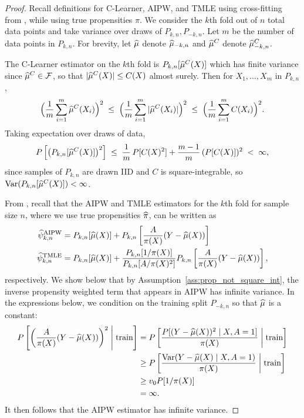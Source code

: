 \begin{proof}
Recall definitions for C-Learner, AIPW, and TMLE using cross-fitting from , while using true propensities $\pi$. 
We consider the $k$th fold out of $n$ total data points and take variance over draws of $P_{k,n},P_{-k,n}$. Let $m$ be the number of data points in $P_{k,n}$. For brevity, let $\widehat{\mu}$ denote $\widehat{\mu}_{-k,n}$ and $\widehat{\mu}^C$ denote $\widehat{\mu}^C_{-k,n}$. 

The C-Learner estimator on the $k$th fold is $P_{k,n}[\widehat{\mu}^C(X)]$ which has finite variance since $\widehat{\mu}^C \in\mathcal F$, so that
$|\widehat{\mu}^C(X)|\leq C(X)$ almost surely. Then for $X_1,\ldots,X_m$ in $P_{k,n}$,
\[
\Big(\frac1m\sum_{i=1}^m \widehat{\mu}^C(X_i)\Big)^2
\;\le\;\Big(\frac1m\sum_{i=1}^m |\widehat{\mu}^C(X_i)|\Big)^2
\;\le\;\Big(\frac1m\sum_{i=1}^m C(X_i)\Big)^2.
\]
Taking expectation over draws of data,
\[
 P\left[\big(P_{k,n}[\widehat{\mu}^C(X)]\big)^2\right]
\;\le\;\frac1m\,P[C(X)^2]
+\frac{m-1}{m}\,(P[C(X)])^2 \;<\;\infty,
\]
since samples of $P_{k,n}$ are drawn IID and $C$ is square-integrable, so ${\rm Var}(P_{k,n}[\widehat{\mu}^C(X)])<\infty$.
 
From , recall that the AIPW and TMLE estimators for the $k$th fold for sample size $n$, where we use true propensities $\widehat{\pi}$, can be written as
\begin{align*}
   \widehat{\psi}^{\rm AIPW}_{k,n}&=P_{k,n}[\widehat{\mu}(X)]+P_{k,n}\left[\frac{A}{\pi(X)}(Y-\widehat{\mu}(X))\right]\\ 
   \widehat{\psi}^{\rm TMLE}_{k,n}&=P_{k,n}[\widehat{\mu}(X)]+\frac{P_{k,n}[1/\pi(X)]}{P_{k,n}[A/\pi(X)^2]}P_{k,n}\left[\frac{A}{\pi(X)}(Y-\widehat{\mu}(X))\right],
\end{align*}
respectively. 
We show below that by Assumption~\ref{ass:prop_not_square_int}, the inverse propensity weighted term that appears in AIPW has infinite variance. In the expressions below, we condition on the training split $P_{-k,n}$ so that $\widehat{\mu}$ is a constant:
\begin{align*}
    P\left[\left(\frac{A}{\pi(X)}(Y-\widehat{\mu}(X))\right)^2 \;\middle|\; \text{train}\right]&=P\left[\frac{P[(Y-\widehat{\mu}(X))^2\mid X,A=1]}{\pi(X)}\;\middle|\; \text{train}\right]\\&\geq P\left[\frac{{\rm Var}(Y-\widehat{\mu}(X)\mid X,A=1)}{\pi(X)}\;\middle|\; \text{train}\right]\\&\geq v_0 P[1/\pi(X)]
    \\&=\infty.
\end{align*}
It then follows that the AIPW estimator has infinite variance. 


\end{proof}
